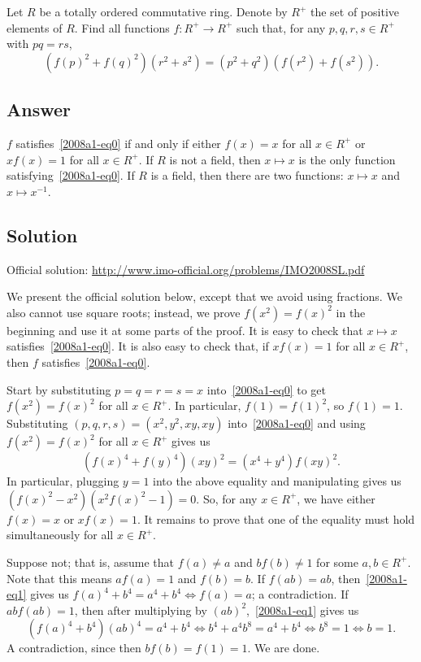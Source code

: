 Let $R$ be a totally ordered commutative ring.
Denote by $R^+$ the set of positive elements of $R$.
Find all functions $f : R^+ \to R^+$ such that, for any $p, q, r, s \in R^+$ with $pq = rs$,
\[ (f(p)^2 + f(q)^2) (r^2 + s^2) = (p^2 + q^2) (f(r^2) + f(s^2)). \tag{*}\label{2008a1-eq0} \]



\subsection*{Answer}

$f$ satisfies~\eqref{2008a1-eq0} if and only if either $f(x) = x$ for all $x \in R^+$ or $x f(x) = 1$ for all $x \in R^+$.
If $R$ is not a field, then $x \mapsto x$ is the only function satisfying~\eqref{2008a1-eq0}.
If $R$ is a field, then there are two functions: $x \mapsto x$ and $x \mapsto x^{-1}$.



\subsection*{Solution}

Official solution: \url{http://www.imo-official.org/problems/IMO2008SL.pdf}

We present the official solution below, except that we avoid using fractions.
We also cannot use square roots; instead, we prove $f(x^2) = f(x)^2$ in the beginning and use it at some parts of the proof.
It is easy to check that $x \mapsto x$ satisfies~\eqref{2008a1-eq0}.
It is also easy to check that, if $x f(x) = 1$ for all $x \in R^+$, then $f$ satisfies~\eqref{2008a1-eq0}.

Start by substituting $p = q = r = s = x$ into~\eqref{2008a1-eq0} to get $f(x^2) = f(x)^2$ for all $x \in R^+$.
In particular, $f(1) = f(1)^2$, so $f(1) = 1$.
Substituting $(p, q, r, s) = (x^2, y^2, xy, xy)$ into~\eqref{2008a1-eq0} and using $f(x^2) = f(x)^2$ for all $x \in R^+$ gives us
\[ (f(x)^4 + f(y)^4) (xy)^2 = (x^4 + y^4) f(xy)^2. \tag{1}\label{2008a1-eq1} \]
In particular, plugging $y = 1$ into the above equality and manipulating gives us $(f(x)^2 - x^2) (x^2 f(x)^2 - 1) = 0$.
So, for any $x \in R^+$, we have either $f(x) = x$ or $x f(x) = 1$.
It remains to prove that one of the equality must hold simultaneously for all $x \in R^+$.

Suppose not; that is, assume that $f(a) \neq a$ and $b f(b) \neq 1$ for some $a, b \in R^+$.
Note that this means $a f(a) = 1$ and $f(b) = b$.
If $f(ab) = ab$, then~\eqref{2008a1-eq1} gives us $f(a)^4 + b^4 = a^4 + b^4 \iff f(a) = a$; a contradiction.
If $ab f(ab) = 1$, then after multiplying by $(ab)^2$,~\eqref{2008a1-eq1} gives us 
\[ (f(a)^4 + b^4) (ab)^4 = a^4 + b^4 \iff b^4 + a^4 b^8 = a^4 + b^4 \iff b^8 = 1 \iff b = 1. \]
A contradiction, since then $b f(b) = f(1) = 1$.
We are done.
